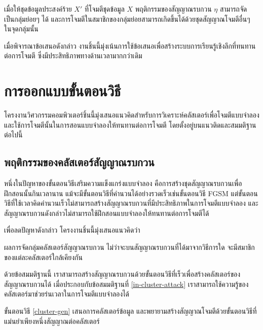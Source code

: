\documentclass{cpereport}
\begin{document}
\begin{claim}
    \label{in-cluster-attack}
    เมื่อให้ชุดข้อมูลประสงค์ร้าย $X'$ ที่โจมตีชุดข้อมูล $X$ พฤติกรรมของสัญญาณรบกวน $\eta$ สามารถจัดเป็นกลุ่มย่อยๆ ได้ และการโจมตีในสมาชิกของกลุ่มย่อยสามารถเกิดขึ้นได้ด้วยชุดสัญญาณโจมตีอื่นๆ ในจุดกลุ่มนั้น
\end{claim}

เมื่อพิจารณาข้อเสนอดังกล่าว งานชิ้นนี้มุ่งเน้นการใช้ข้อเสนอเพื่อสร้างระบบการเรียนรู้เชิงลึกที่ทนทานต่อการโจมตี ซึ่งมีประสิทธิภาพทางด้านเวลามากกว่าเดิม

\section{การออกแบบขั้นตอนวิธี}

โครงงานวิศวกรรมคอมพิวเตอร์ชิ้นนี้มุ่งเสนอแนวคิดสำหรับการวิเคราะห์คลัสเตอร์เพื่อโจมตีแบบจำลองและใช้การโจมตีนั้นในการสอนแบบจำลองให้ทนทานต่อการโจมตี โดยตั้งอยู่บนแนวติดและสมมติฐานต่อไปนี้

\subsection{พฤติกรรมของคลัสเตอร์สัญญาณรบกวน}

หนึ่งในปัญหาของขั้นตอนวิธีเสริมความแข็งแกร่งแบบจำลอง คือการสร้างชุดสัญญาณรบกวนเพื่อฝึกสอนนั้นกินเวลานาน แม้จะมีขั้นตอนวิธีที่คำนวนได้อย่างรวดเร็วเช่นขั้นตอนวิธี FGSM แต่ขั้นตอนวิธีที่ใช้เวลาคิดคำนวนเร็วไม่สามารถสร้างสัญญาณรบกวนที่มีประสิทธิภาพในการโจมตีแบบจำลอง และสัญญาณรบกวนดังกล่าวไม่สามารถใช้ฝึกสอนแบบจำลองให้ทนทานต่อการโจมตีได้ \cite{aleks2017deep}

เพื่อลดปัญหาดังกล่าว โครงงานชิ้นนี้มุ่งเสนอแนวคิดว่า

\begin{claim}
    \label{slow-fast-same}
    ผลการจัดกลุ่มคลัสเตอร์สัญญาณรบกวน ไม่ว่าจะบนสัญญาณรบกวนที่ได้มาจากวิธีการใด จะมีสมาชิกของแต่ละคลัสเตอร์ใกล้เคียงกัน
\end{claim}

ด้วยข้อสมมติฐานนี้ เราสามารถสร้างสัญญาณรบกวนด้วยขั้นตอนวิธีที่เร็วเพื่อสร้างคลัสเตอร์ของสัญญาณรบกวนได้ เมื่อประกอบกับข้อสมมติฐานที่ \ref{in-cluster-attack} เราสามารถใช้ความรู้ของคลัสเตอร์มาช่วยร่นเวลาในการโจมตีแบบจำลองได้

ขั้นตอนวิธี \ref{cluster-gen} เสนอการคลัสเตอร์ข้อมูล และพยายามสร้างสัญญาณโจมตีด้วยขั้นตอนวิธีที่แม่นยำเพียงหนึ่งสัญญาณต่อคลัสเตอร์ 
\end{document}
